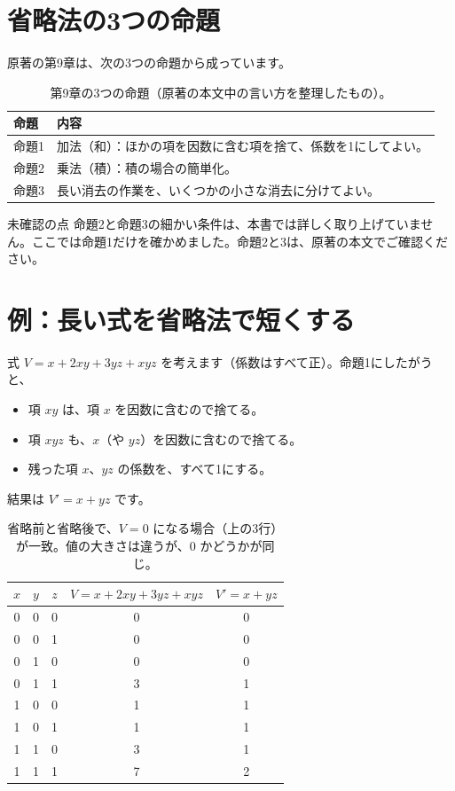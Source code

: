 \documentclass[a4paper,11pt,openany]{ltjsbook}
\begin{document}
\section{省略法の3つの命題}

原著の第9章は、次の3つの命題から成っています。

\begin{table}[htbp]
\centering
\small
\begin{tabular}{lp{9cm}}
\toprule
命題 & 内容\\
\midrule
命題1 & 加法（和）：ほかの項を因数に含む項を捨て、係数を1にしてよい。\\
命題2 & 乗法（積）：積の場合の簡単化。\\
命題3 & 長い消去の作業を、いくつかの小さな消去に分けてよい。\\
\bottomrule
\end{tabular}
\caption{第9章の3つの命題（原著の本文中の言い方を整理したもの）。}
\end{table}

\begin{notebox}{未確認の点}
命題2と命題3の細かい条件は、本書では詳しく取り上げていません。ここでは命題1だけを確かめました。命題2と3は、原著の本文でご確認ください。
\end{notebox}

\section{例：長い式を省略法で短くする}

式 $V=x+2xy+3yz+xyz$ を考えます（係数はすべて正）。命題1にしたがうと、

\begin{itemize}[leftmargin=*]
\item 項 $xy$ は、項 $x$ を因数に含むので捨てる。
\item 項 $xyz$ も、$x$（や $yz$）を因数に含むので捨てる。
\item 残った項 $x$、$yz$ の係数を、すべて1にする。
\end{itemize}

結果は $V'=x+yz$ です。

\begin{table}[htbp]
\centering
\begin{tabular}{ccc|cc}
\toprule
$x$ & $y$ & $z$ & $V=x+2xy+3yz+xyz$ & $V'=x+yz$\\
\midrule
0 & 0 & 0 & 0 & 0\\
0 & 0 & 1 & 0 & 0\\
0 & 1 & 0 & 0 & 0\\
0 & 1 & 1 & 3 & 1\\
1 & 0 & 0 & 1 & 1\\
1 & 0 & 1 & 1 & 1\\
1 & 1 & 0 & 3 & 1\\
1 & 1 & 1 & 7 & 2\\
\bottomrule
\end{tabular}
\caption{省略前と省略後で、$V=0$ になる場合（上の3行）が一致。値の大きさは違うが、$0$ かどうかが同じ。}
\end{table}
\end{document}
